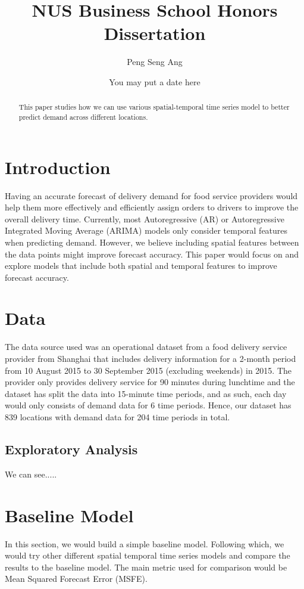 \documentclass[10pt, letterpaper] {article}
\begin{document}
	\title{NUS Business School Honors Dissertation}
	\author{Peng Seng Ang}
	\date{You may put a date here}
	\maketitle
\begin{abstract}
This paper studies how we can use various spatial-temporal time series model to better predict demand across different locations. 
\end{abstract}
\section{Introduction}
Having an accurate forecast of delivery demand for food service providers would help them more effectively and efficiently assign orders to drivers to improve the overall delivery time. Currently, most Autoregressive (AR) or Autoregressive Integrated Moving Average (ARIMA) models only consider temporal features when predicting demand. However, we believe including spatial features between the data points might improve forecast accuracy. This paper would focus on and explore models that include both spatial and temporal features to improve forecast accuracy. 
\section{Data}
The data source used was an operational dataset from a food delivery service provider from Shanghai that includes delivery information for a 2-month period from 10 August 2015 to 30 September 2015 (excluding weekends) in 2015. The provider only provides delivery service for 90 minutes during lunchtime and the dataset has split the data into 15-minute time periods, and as such, each day would only consists of demand data for 6 time periods. Hence, our dataset has 839 locations with demand data for 204 time periods in total. 

\subsection{Exploratory Analysis}
We can see.....
\section{Baseline Model}
In this section, we would build a simple baseline model. Following which, we would try other different spatial temporal time series models and compare the results to the baseline model. The main metric used for comparison would be Mean Squared Forecast Error (MSFE). 
\end{document}
